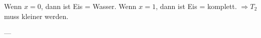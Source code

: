 Wenn \( x = 0 \), dann ist Eis = Wasser.  
Wenn \( x = 1 \), dann ist Eis = komplett.  
\( \Rightarrow T_2 \) muss kleiner werden.  

---